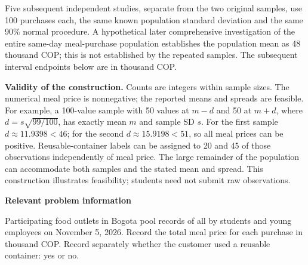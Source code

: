 Five subsequent independent studies, separate from the two original samples, use 100 purchases each, the same known population standard deviation and the same 90\% normal procedure. A hypothetical later comprehensive investigation of the entire same-day meal-purchase population establishes the population mean as 48 thousand COP; this is not established by the repeated samples. The subsequent interval endpoints below are in thousand COP.



\textbf{Validity of the construction.} Counts are integers within sample sizes. The numerical meal price is nonnegative; the reported means and spreads are feasible. For example, a 100-value sample with 50 values at $m-d$ and 50 at $m+d$, where $d=s\sqrt{99/100}$, has exactly mean $m$ and sample SD $s$. For the first sample $d\approx11.9398<46$; for the second $d\approx15.9198<51$, so all meal prices can be positive. Reusable-container labels can be assigned to 20 and 45 of those observations independently of meal price. The large remainder of the population can accommodate both samples and the stated mean and spread. This construction illustrates feasibility; students need not submit raw observations.

\secInicio[][sec:p3]

\clearpage



\textbf{Relevant problem information}

\begin{probleminfoexcerpt}
Participating food outlets in Bogota pool records of all     by students and young employees on November 5, 2026. Record the total meal price for each purchase in thousand COP. Record separately whether the customer used a reusable container: yes or no.
\end{probleminfoexcerpt}

